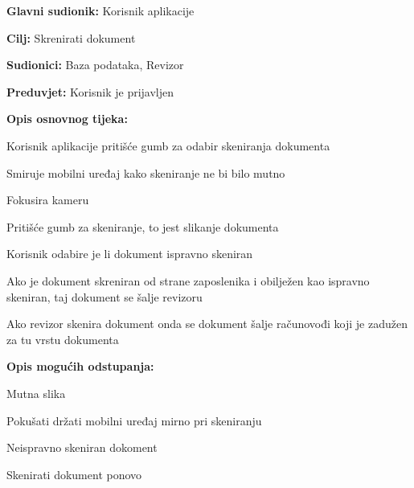 	\noindent {}
	\begin{packed_item}
		
		\item \textbf{Glavni sudionik: }Korisnik aplikacije
		\item  \textbf{Cilj:} Skrenirati dokument
		\item  \textbf{Sudionici:} Baza podataka, Revizor
		\item  \textbf{Preduvjet:} Korisnik je prijavljen
		\item  \textbf{Opis osnovnog tijeka:}
		
		\item[] \begin{packed_enum}
			
			\item Korisnik aplikacije pritišće gumb za odabir skeniranja dokumenta
			\item Smiruje mobilni uređaj kako skeniranje ne bi bilo mutno
			\item Fokusira kameru
			\item Pritišće gumb za skeniranje, to jest slikanje dokumenta
			\item Korisnik odabire je li dokument ispravno skeniran
			\item Ako je dokument skreniran od strane zaposlenika i obilježen kao ispravno skeniran, taj dokument se šalje revizoru
			\item Ako revizor skenira dokument onda se dokument šalje računovođi koji je zadužen za tu vrstu dokumenta
			
			
		\end{packed_enum}
		
		\item  \textbf{Opis mogućih odstupanja:}
		
		\item[] \begin{packed_item}
			
			\item[2.a] Mutna slika
			\item[] \begin{packed_enum}
				
				\item Pokušati držati mobilni uređaj mirno pri skeniranju
				
				
			\end{packed_enum}
			
			\item[5.a] Neispravno skeniran dokoment
			\item[] \begin{packed_enum}
				
				\item Skenirati dokument ponovo
				
				
			\end{packed_enum}
			
			
		\end{packed_item}
	\end{packed_item}
	
